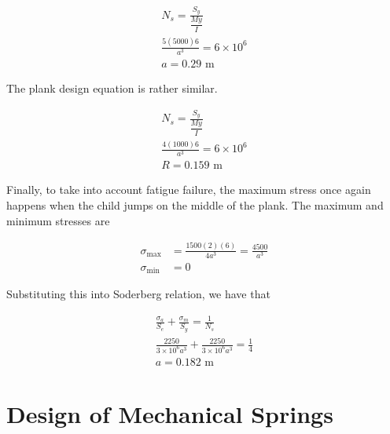 \documentclass[
10pt,
a4paper,
openany,
svgnames,
]{book}
\begin{document}
\begin{evensolution}
  \begin{align*}
    N_s = \frac{S_y}{\dfrac{My}{I}} \\
    \frac{5(5000)6}{ a^3} = 6 \times 10^6 \\
    a = 0.29 \text{ m}
  \end{align*}

  The plank design equation is rather similar.

  \begin{align*}
    N_s = \frac{S_y}{\dfrac{My}{I}} \\
    \frac{4(1000)6}{ a^3} = 6 \times 10^6 \\
    R = 0.159 \text{ m}
  \end{align*}

  Finally, to take into account fatigue failure, the maximum stress once again
  happens when the child jumps on the middle of the plank. The maximum and
  minimum stresses are

  \begin{align*}
    \sigma_{\max} &= \frac{1500(2)(6)}{4a^3} = \frac{4500}{a^3} \\
    \sigma_{\min} &= 0
  \end{align*}

  Substituting this into Soderberg relation, we have that

  \begin{align*}
    \frac{\sigma_a}{S_e} + \frac{\sigma_m}{S_y} = \frac{1}{N_s} \\
    \frac{2250}{3 \times 10^6 a^3} + \frac{2250}{3 \times 10^6 a^3} = \frac{1}{4} \\
    a = 0.182 \text{ m}
  \end{align*}
  
\end{evensolution}

\section{Design of Mechanical Springs}
\end{document}
